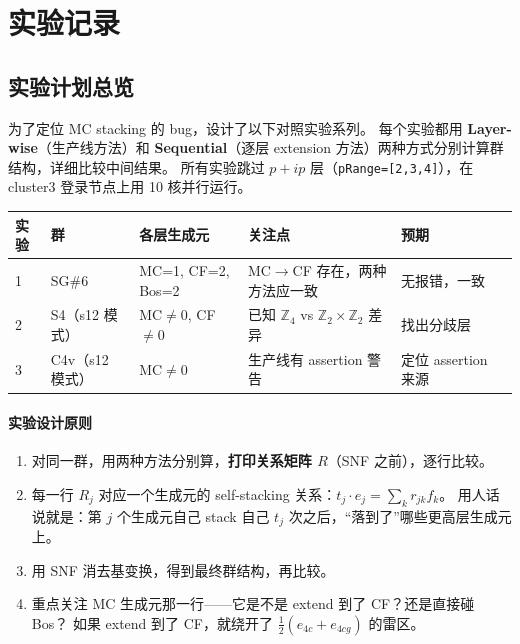 \documentclass[a4paper,fontset=ubuntu,12pt]{ctexart}
\begin{document}

\section{实验记录}
\label{sec:experiments}

\subsection{实验计划总览}
\label{sec:exp-plan}

为了定位 MC stacking 的 bug，设计了以下对照实验系列。
每个实验都用 \textbf{Layer-wise}（生产线方法）和 \textbf{Sequential}（逐层 extension 方法）两种方式分别计算群结构，详细比较中间结果。
所有实验跳过 $p{+}ip$ 层（\texttt{pRange=[2,3,4]}），在 cluster3 登录节点上用 10 核并行运行。

\begin{center}
\begin{tabular}{llllll}
\hline
实验 & 群 & 各层生成元 & 关注点 & 预期 \\
\hline
1 & SG\#6 & MC=1, CF=2, Bos=2 & MC$\to$CF 存在，两种方法应一致 & 无报错，一致 \\
2 & S4（s12 模式） & MC$\neq$0, CF$\neq$0 & 已知 $\mathbb{Z}_4$ vs $\mathbb{Z}_2\times\mathbb{Z}_2$ 差异 & 找出分歧层 \\
3 & C4v（s12 模式） & MC$\neq$0 & 生产线有 assertion 警告 & 定位 assertion 来源 \\
\hline
\end{tabular}
\end{center}

\paragraph{实验设计原则}
\begin{enumerate}
\item 对同一群，用两种方法分别算，\textbf{打印关系矩阵 $R$}（SNF 之前），逐行比较。
\item 每一行 $R_j$ 对应一个生成元的 self-stacking 关系：$t_j \cdot e_j = \sum_k r_{jk} f_k$。
  用人话说就是：第 $j$ 个生成元自己 stack 自己 $t_j$ 次之后，``落到了''哪些更高层生成元上。
\item 用 SNF 消去基变换，得到最终群结构，再比较。
\item 重点关注 MC 生成元那一行——它是不是 extend 到了 CF？还是直接碰 Bos？
  如果 extend 到了 CF，就绕开了 $\frac{1}{2}(e_{4c}+e_{4cg})$ 的雷区。
\end{enumerate}
\end{document}
